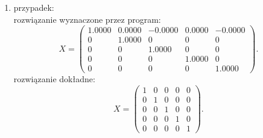 \documentclass[12pt]{article}
\begin{document}
\begin{enumerate}
\item przypadek:
\\
rozwi\k{a}zanie wyznaczone przez program:
\[
X=\begin{pmatrix}
1.0000 & 0.0000 & -0.0000 & 0.0000 & -0.0000 \\
0 & 1.0000 & 0 & 0 & 0 \\
0 & 0 & 1.0000 & 0 & 0 \\
0 & 0 & 0 & 1.0000 & 0 \\
0 & 0 & 0 & 0 & 1.0000
\end{pmatrix}.
\]
rozwi\k{a}zanie dok\l{}adne:
\[
X=\begin{pmatrix}
1 & 0 & 0 & 0 & 0 \\
0 & 1 & 0 & 0 & 0 \\
0 & 0 & 1 & 0 & 0 \\
0 & 0 & 0 & 1 & 0 \\
0 & 0 & 0 & 0 & 1
\end{pmatrix}.
\]


\end{enumerate}
\end{document}
